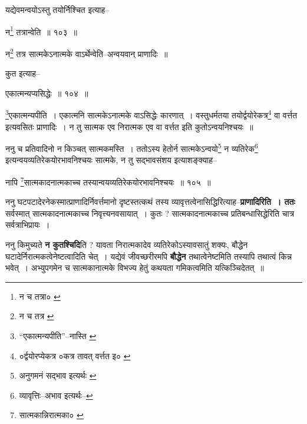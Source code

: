 \documentclass[article,12pt,a4paper]{memoir}
\begin{document}
	  \pstart यद्येवमन्वयोऽस्तु तयोर्निश्चित इत्याह--
	\pend
       
	  \bigskip
	  \begingroup
	

	  \pstart न\footnote{न च तत्रा० \cite{dp-msC} \cite{dp-msD}} तत्रान्वेति ॥ १०३ ॥
	\pend
      
	  \endgroup
	 

	  \pstart न\footnote{न च तत्र \cite{dp-msD}} तत्र सात्मकेऽनात्मके वाऽर्थेन्वेति--अन्वयवान् प्राणादिः ॥
	\pend
       

	  \pstart कुत इत्याह--
	\pend
       
	  \bigskip
	  \begingroup
	

	  \pstart एकात्मन्यप्यसिद्धेः ॥ १०४ ॥
	\pend
      
	  \endgroup
	 

	  \pstart \footnote{“एकात्मन्यपीति”--नास्ति \cite{dp-msA} \cite{dp-msB} \cite{dp-msC} \cite{dp-msD} \cite{dp-edP} \cite{dp-edH} \cite{dp-edN}}\-एकात्मन्यपीति । एकात्मनि सात्मकेऽनात्मके वाऽसिद्धेः कारणात् । वस्तुधर्मतया तयोर्द्वयोरेकत्र\footnote{०र्द्वयोरप्येकत्र \cite{dp-msC} \cite{dp-msD} ०कत्र तावत् वर्त्तत इ० \cite{dp-msC}} वा वर्त्तत इत्यवसितः प्राणादिः । न तु सात्मक एव निरात्मक एव वा वर्त्तत इति कुतोऽन्वयनिश्चयः ॥
	\pend
       

	  \pstart ननु च प्रतिवादिनो न किञ्चत् सात्मकमस्ति । ततोऽस्य हेतोर्न सात्मकेऽन्वयो\footnote{अनुगमनं सद्भाव इत्यर्थः \cite{dp-msD-n}} न व्यतिरेक\footnote{व्यावृत्तिः--अभाव इत्यर्थः--\cite{dp-msD-n}} इत्यन्वयव्यतिरेकयोरभावनिश्चयः सात्मके, न तु सद्भावसंशय इत्याशङ्क्याह--
	\pend
       
	  \bigskip
	  \begingroup
	

	  \pstart नापि \footnote{सात्मकान्निरात्मका० \cite{dp-msB} \cite{dp-msD} \cite{dp-edP} \cite{dp-edH} \cite{dp-edE} \cite{dp-edN}}\-सात्मकादनात्मकाच्च तस्यान्वयव्यतिरेकयोरभावनिश्चयः ॥ १०५ ॥
	\pend
      
	  \endgroup
	
	  \endgroup
	

	  \pstart ननु घटपटादेरनेकस्मात्प्राणादिर्निवर्त्तमानो दृष्टस्तत्कथं तस्य व्यावृत्तत्वेनासिद्धिरित्याह--\textbf{प्राणादिरिति । ततः} सर्वस्मात् सात्मकादनात्मकाच्च निवृत्त्यनवसायात् । कुतः ? सात्मकादनात्मकाच्च प्रतिबन्धासिद्धेरिति चात्र सर्वत्राभिप्रायः ।
	\pend
      

	  \pstart ननु किमुच्यते \textbf{न कुतश्चिदि}ति ? यावता निरात्मकादेव व्यतिरेकोऽस्यावसातुं शक्यः, बौद्धेन घटादेर्निरात्मकत्वेनेष्टत्वादिति चेत् । यद्येवं जीवच्छरीरमपि \textbf{बौद्धेन} तथात्वेनेष्टमिति तस्यापि तथात्वं किन्न भवेत् । अभ्युपगमेन च सात्मकानात्मके विभज्य हेतुं कथयता गमिकत्वमिति यत्किञ्चिदेतत् ॥
	\pend
      
\end{document}
